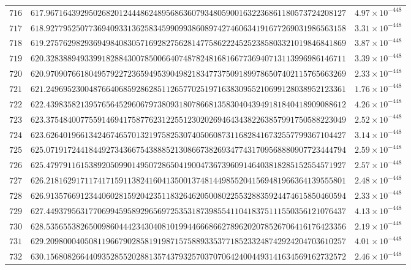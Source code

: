 \documentclass[12pt,reqno]{amsart}
\theoremstyle{remark}
\begin{document}
\begin{longtable}{clc}
$716$ & $617.9671643929502682012444862489568636079348059001632236861180573724208127$ & $4.97\times 10^{-448}$ \\
$717$ & $618.9277952507736940933136258345990993860897427460634191677269031986563158$ & $3.31\times 10^{-448}$ \\
$718$ & $619.2757629829369498408305716928275628147758622245252385803321019846841869$ & $3.87\times 10^{-448}$ \\
$719$ & $620.3283889493399182884300785006640748782481681667736940713113996986146711$ & $3.39\times 10^{-448}$ \\
$720$ & $620.9709076618049579227236594953904982183477375091899786507402115765663269$ & $2.33\times 10^{-448}$ \\
$721$ & $621.2496952300487664068592862851126577025197163830955210699128038952123361$ & $1.76\times 10^{-448}$ \\
$722$ & $622.4398358213957656452960679738093180786681358304043949181840418909088612$ & $4.26\times 10^{-448}$ \\
$723$ & $623.3754840077559146941758776231225512302026946434382263857991750588223049$ & $2.52\times 10^{-448}$ \\
$724$ & $623.6264019661342467465701321975825307405060873116828416732557799367104427$ & $3.14\times 10^{-448}$ \\
$725$ & $625.0719172441844927343667543888521308667382693477431709568880907723444794$ & $2.59\times 10^{-448}$ \\
$726$ & $625.4797911615389205099014950728650419004736739609146403818285152554571927$ & $2.57\times 10^{-448}$ \\
$727$ & $626.2181629171174171591138241604135001374814498552041569481966364139555801$ & $2.48\times 10^{-448}$ \\
$728$ & $626.9135766912344060281592042351183264620500802255328835924474615850460594$ & $2.33\times 10^{-448}$ \\
$729$ & $627.4493795631770699459589296569725353187398554110418375111550356121076437$ & $4.13\times 10^{-448}$ \\
$730$ & $628.5356553826500986044423430408101994466686627896202078526706416176423356$ & $2.19\times 10^{-448}$ \\
$731$ & $629.2098000405081196679028581919871575889335377185233248742924204703610257$ & $4.01\times 10^{-448}$ \\
$732$ & $630.1568082664409352855202881357437932570370706424004493141634569162732572$ & $2.46\times 10^{-448}$ \\

\end{longtable}
\end{document}
